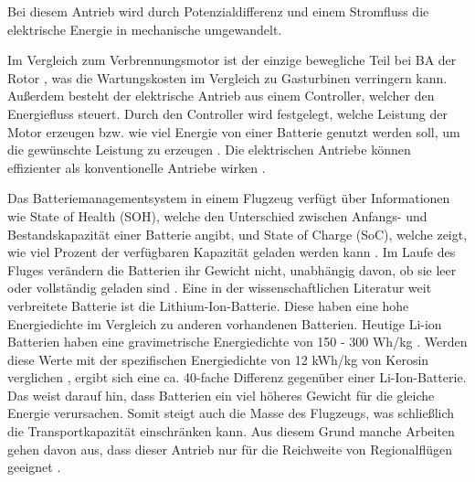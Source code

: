 
Bei diesem Antrieb wird durch Potenzialdifferenz und einem Stromfluss die elektrische Energie in mechanische umgewandelt.

Im Vergleich zum Verbrennungsmotor ist der einzige bewegliche Teil bei BA der Rotor \cite{donckers2024electric}, 
was die Wartungskosten im Vergleich zu Gasturbinen verringern kann. Außerdem besteht der elektrische Antrieb aus einem Controller, welcher den Energiefluss steuert. 
Durch den Controller wird festgelegt, welche Leistung der Motor erzeugen bzw. wie viel Energie von 
einer Batterie genutzt werden soll, um die gewünschte Leistung zu erzeugen \cite{donckers2024electric}. 
Die elektrischen Antriebe können effizienter als konventionelle Antriebe wirken \cite{hepperle2012electric}.

Das Batteriemanagementsystem in einem Flugzeug verfügt über Informationen wie State of Health (SOH), welche den Unterschied zwischen Anfangs-
und Bestandskapazität einer Batterie angibt, und State of Charge (SoC), welche zeigt, wie viel Prozent der verfügbaren Kapazität geladen werden kann \cite{donckers2024electric}.
Im Laufe des Fluges verändern die Batterien ihr Gewicht nicht, unabhängig davon, ob sie leer oder vollständig geladen sind \cite{donckers2024electric}. 
Eine in der wissenschaftlichen Literatur weit verbreitete Batterie ist die Lithium-Ion-Batterie. Diese haben eine hohe Energiedichte im Vergleich zu anderen vorhandenen Batterien. %
Heutige Li-ion Batterien haben eine gravimetrische Energiedichte von 150 - 300 Wh/kg \cite{colpan2022fuel}. Werden diese Werte mit der spezifischen Energiedichte von 12 kWh/kg von Kerosin verglichen \cite{dalmia2022powering},
ergibt sich eine ca. 40-fache Differenz gegenüber einer Li-Ion-Batterie. Das weist darauf hin, dass Batterien ein viel höheres Gewicht für die gleiche Energie verursachen. 
Somit steigt auch die Masse des Flugzeugs, was schließlich die Transportkapazität einschränken kann. 
Aus diesem Grund manche Arbeiten gehen davon aus, dass dieser Antrieb nur für die Reichweite von Regionalflügen geeignet \cite{abrantes2024impact}.

